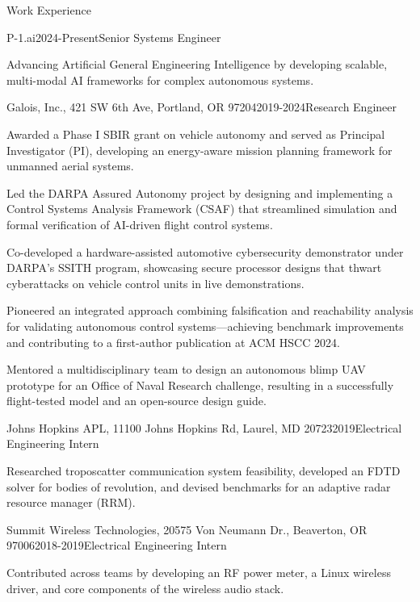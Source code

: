 \documentclass{resume}
\begin{document}
\begin{rSection}{Work Experience}

\begin{rSubsection}{P-1.ai}{2024-Present}{Senior Systems Engineer}{}
\item Advancing Artificial General Engineering Intelligence by developing scalable, multi-modal AI frameworks for complex autonomous systems.
\end{rSubsection}

\begin{rSubsection}{Galois, Inc., 421 SW 6th Ave, Portland, OR 97204}{2019-2024}{Research Engineer}{}
\item Awarded a Phase I SBIR grant on vehicle autonomy and served as Principal Investigator (PI), developing an energy-aware mission planning framework for unmanned aerial systems.
\item Led the DARPA Assured Autonomy project by designing and implementing a Control Systems Analysis Framework (CSAF) that streamlined simulation and formal verification of AI-driven flight control systems.
\item Co-developed a hardware-assisted automotive cybersecurity demonstrator under DARPA’s SSITH program, showcasing secure processor designs that thwart cyberattacks on vehicle control units in live demonstrations.
\item Pioneered an integrated approach combining falsification and reachability analysis for validating autonomous control systems—achieving benchmark improvements and contributing to a first-author publication at ACM HSCC 2024.
\item Mentored a multidisciplinary team to design an autonomous blimp UAV prototype for an Office of Naval Research challenge, resulting in a successfully flight-tested model and an open-source design guide.
\end{rSubsection}

\begin{rSubsection}{Johns Hopkins APL, 11100 Johns Hopkins Rd, Laurel, MD 20723}{2019}{Electrical Engineering Intern}{}
\item Researched troposcatter communication system feasibility, developed an FDTD solver for bodies of revolution, and devised benchmarks for an adaptive radar resource manager (RRM).
\end{rSubsection}

\begin{rSubsection}{Summit Wireless Technologies, 20575 Von Neumann Dr., Beaverton, OR 97006}{2018-2019}{Electrical Engineering Intern}{}
\item Contributed across teams by developing an RF power meter, a Linux wireless driver, and core components of the wireless audio stack.
\end{rSubsection}


\end{rSection}
\end{document}
